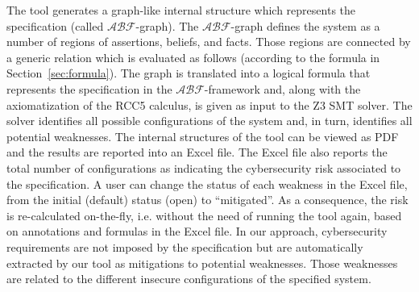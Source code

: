 \documentclass[conference]{IEEEtran}
\newcommand{\assertionRegion}{\mathcal{A}}
\newcommand{\beliefRegion}{\mathcal{B}}
\newcommand{\factRegion}{\mathcal{F}}
\newcommand{\abftheory}{\assertionRegion\beliefRegion\factRegion}
\begin{document}
The tool generates a graph-like internal structure which represents
the specification (called $\abftheory$-graph). The $\abftheory$-graph defines the system as
a number of regions of assertions, beliefs, and facts. Those regions
are connected by a generic relation which is evaluated as follows (according to
the formula in Section~\ref{sec:formula}).
The graph is translated into 
a logical formula that represents the specification in the $\abftheory$-framework and,
along with the axiomatization of the RCC5 calculus, is given as input to the Z3 SMT solver.
The solver identifies all possible configurations of the system and, in turn,
identifies all potential weaknesses. 
The internal structures of the tool
can be viewed as PDF and the results are reported into an Excel file.
The Excel file also reports the total number of configurations as indicating
the cybersecurity risk associated to the specification. A user can change the status
of each weakness in the Excel file, from the initial (default) status (open)
to ``mitigated''. As a consequence, the risk is re-calculated on-the-fly, i.e.
without the need of running the tool again, based on annotations and formulas 
in the Excel file.
In our approach, cybersecurity requirements are not imposed by the
specification but are automatically extracted by our tool as mitigations to potential weaknesses.
Those weaknesses are related to the different insecure configurations 
of the specified system. 
\end{document}
